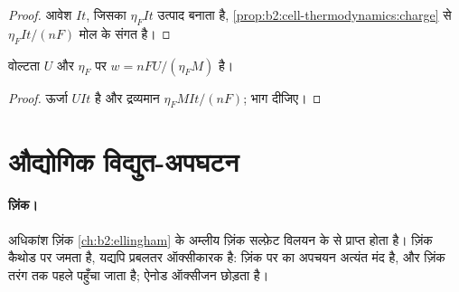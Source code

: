 \begin{proof}
आवेश $It$, जिसका $\eta_F It$ उत्पाद बनाता है,
\cref{prop:b2:cell-thermodynamics:charge} से $\eta_F It/(nF)$ मोल के संगत है।
\end{proof}

\begin{proposition}[प्रति किलोग्राम ऊर्जा]\label{prop:b2:batteries-electrolysis:energy}
वोल्टता $U$ और  $\eta_F$ पर  $w = nFU/(\eta_F M)$ है।
\end{proposition}

\begin{proof}
ऊर्जा $UIt$ है और द्रव्यमान $\eta_F MIt/(nF)$; भाग दीजिए।
\end{proof}

\section{औद्योगिक विद्युत-अपघटन}

\paragraph{ज़िंक।} अधिकांश ज़िंक \cref{ch:b2:ellingham} के अम्लीय ज़िंक सल्फ़ेट
विलयन के  से प्राप्त होता है। ज़िंक कैथोड पर जमता है, यद्यपि
 प्रबलतर ऑक्सीकारक है: ज़िंक पर  का अपचयन अत्यंत मंद है,
और ज़िंक तरंग तक पहले पहुँचा जाता है; ऐनोड ऑक्सीजन छोड़ता है।

